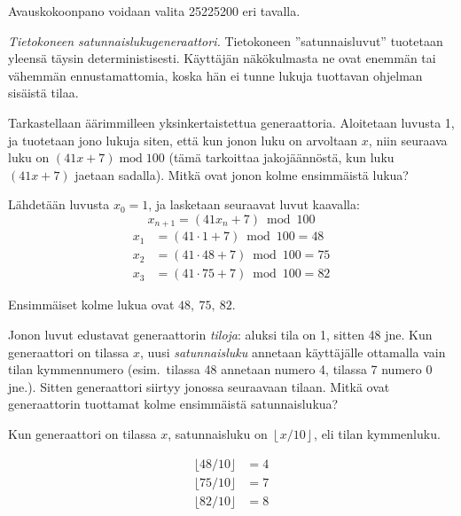 \documentclass[12pt,a4paper]{article}
\begin{document}
\vspace{0.3cm}
Avauskokoonpano voidaan valita 25225200 eri tavalla.








\newpage
{}

\emph{Tietokoneen satunnaislukugeneraattori.} Tietokoneen 
''satunnaisluvut'' tuotetaan yleensä täysin deterministisesti. Käyttäjän 
näkökulmasta ne ovat enemmän tai vähemmän ennustamattomia, koska hän ei
tunne lukuja tuottavan ohjelman sisäistä tilaa.

\begin{kohta}

  \item Tarkastellaan äärimmilleen yksinkertaistettua generaattoria. 
Aloitetaan luvusta 1, ja tuotetaan jono lukuja siten, että kun jonon luku
on arvoltaan $x$, niin seuraava luku on $(41x+7)\operatorname{mod}100$
(tämä tarkoittaa jakojäännöstä, kun luku $(41x+7)$ jaetaan sadalla). Mitkä ovat
jonon kolme ensimmäistä lukua?

  Lähdetään luvusta \(x_0 = 1\), ja lasketaan seuraavat luvut kaavalla:
  \[
  x_{n+1} = (41x_n + 7) \bmod 100
  \]
  \begin{align*}
  x_1 &= (41 \cdot 1 + 7) \bmod 100 = 48 \\
  x_2 &= (41 \cdot 48 + 7) \bmod 100 = 75 \\
  x_3 &= (41 \cdot 75 + 7) \bmod 100 = 82
  \end{align*}

  Ensimmäiset kolme lukua ovat \(48,\ 75,\ 82\).

  \item Jonon luvut edustavat generaattorin \emph{tiloja}: aluksi tila on 1, 
sitten 48 jne. Kun generaattori on tilassa $x$, uusi \emph{satunnaisluku} annetaan
käyttäjälle ottamalla vain tilan kymmennumero (esim.\ tilassa 48 annetaan 
numero 4, tilassa 7 numero 0 jne.). Sitten generaattori siirtyy jonossa
seuraavaan tilaan. Mitkä ovat generaattorin tuottamat kolme ensimmäistä
satunnaislukua?

  Kun generaattori on tilassa \(x\), satunnaisluku on \(\left\lfloor x/10 \right\rfloor\), eli tilan kymmenluku.

  \begin{align*}
  \lfloor 48/10 \rfloor &= 4 \\
  \lfloor 75/10 \rfloor &= 7 \\
  \lfloor 82/10 \rfloor &= 8
  \end{align*}


\end{kohta}
\end{document}
